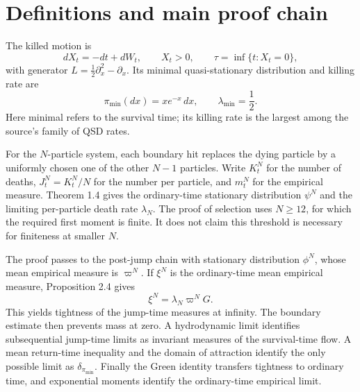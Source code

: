 \documentclass[10pt]{article}
\begin{document}
\section*{Definitions and main proof chain}
The killed motion is \[dX_t=-dt+dW_t,\qquad X_t>0,\qquad \tau=\inf\{t:X_t=0\},\] with generator \(L=\frac12\partial_x^2-\partial_x\). Its minimal quasi-stationary distribution and killing rate are \[\pi_{\min}(dx)=xe^{-x}\,dx,\qquad \lambda_{\min}=\frac12.\] Here minimal refers to the survival time; its killing rate is the largest among the source’s family of QSD rates.\par
For the \(N\)-particle system, each boundary hit replaces the dying particle by a uniformly chosen one of the other \(N-1\) particles. Write \(K_t^N\) for the number of deaths, \(J_t^N=K_t^N/N\) for the number per particle, and \(m_t^N\) for the empirical measure. Theorem 1.4 gives the ordinary-time stationary distribution \(\psi^N\) and the limiting per-particle death rate \(\lambda_N\). The proof of selection uses \(N\geq12\), for which the required first moment is finite. It does not claim this threshold is necessary for finiteness at smaller \(N\).\par
The proof passes to the post-jump chain with stationary distribution \(\phi^N\), whose mean empirical measure is \(\varpi^N\). If \(\xi^N\) is the ordinary-time mean empirical measure, Proposition 2.4 gives \[\xi^N=\lambda_N\varpi^NG.\] This yields tightness of the jump-time measures at infinity. The boundary estimate then prevents mass at zero. A hydrodynamic limit identifies subsequential jump-time limits as invariant measures of the survival-time flow. A mean return-time inequality and the domain of attraction identify the only possible limit as \(\delta_{\pi_{\min}}\). Finally the Green identity transfers tightness to ordinary time, and exponential moments identify the ordinary-time empirical limit.\par
\end{document}
